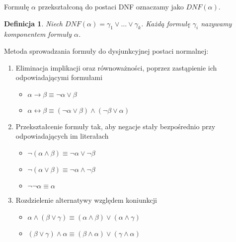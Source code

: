 \documentclass[11pt,a4paper]{article}
\newtheorem{defn}{Definicja}
\begin{document}
Formułę $\alpha$ przekształconą do postaci DNF oznaczamy jako $DNF(\alpha)$.

\begin{defn}
Niech $DNF(\alpha) = \gamma_1 \vee \dots \vee \gamma_k$. Każdą formułę $\gamma_i$ nazywamy komponentem formuły $\alpha$.
\end{defn}

Metoda sprowadzania formuły do dysjunkcyjnej postaci normalnej:

\begin{enumerate}
	\item Eliminacja implikacji oraz równoważności, poprzez zastąpienie ich 			odpowiadającymi formułami 
		\begin{itemize}
			\item $\alpha \rightarrow \beta \equiv \neg\alpha \vee \beta$
			\item $\alpha \leftrightarrow \beta \equiv (\neg\alpha \vee \beta) \wedge (\neg\beta \vee \alpha)$
		\end{itemize}
	\item Przekształcenie formuły tak, aby negacje stały bezpośrednio przy odpowiadających im literałach
		\begin{itemize}
			\item $\neg(\alpha \wedge \beta) \equiv \neg\alpha \vee \neg\beta$
			\item $\neg(\alpha \vee \beta) \equiv \neg\alpha \wedge \neg\beta$
			\item $\neg\neg\alpha \equiv \alpha$
		\end{itemize}
		\item Rozdzielenie alternatywy względem koniunkcji
		\begin{itemize}
			\item $\alpha \wedge (\beta \vee \gamma) \equiv (\alpha \wedge \beta) \vee (\alpha \wedge \gamma)$
			\item $(\beta \vee \gamma) \wedge \alpha \equiv (\beta \wedge \alpha) \vee (\gamma \wedge \alpha)$
		\end{itemize}
\end{enumerate}

\end{document}
